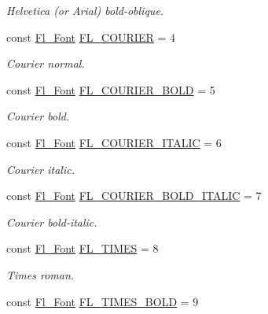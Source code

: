 \begin{DoxyCompactItemize}
\begin{DoxyCompactList}\small\item\em Helvetica (or Arial) bold-\/oblique. \end{DoxyCompactList}\item 
const \hyperlink{_enumerations_8_h_a2ac46d9f082834b969fffe490a03a709}{Fl\+\_\+\+Font} \hyperlink{_enumerations_8_h_ae722fe030bd9bcba33f045098295579d}{F\+L\+\_\+\+C\+O\+U\+R\+I\+ER} = 4
\begin{DoxyCompactList}\small\item\em Courier normal. \end{DoxyCompactList}\item 
const \hyperlink{_enumerations_8_h_a2ac46d9f082834b969fffe490a03a709}{Fl\+\_\+\+Font} \hyperlink{_enumerations_8_h_a311479135f085f16d2a7432af8f482eb}{F\+L\+\_\+\+C\+O\+U\+R\+I\+E\+R\+\_\+\+B\+O\+LD} = 5
\begin{DoxyCompactList}\small\item\em Courier bold. \end{DoxyCompactList}\item 
const \hyperlink{_enumerations_8_h_a2ac46d9f082834b969fffe490a03a709}{Fl\+\_\+\+Font} \hyperlink{_enumerations_8_h_afc9d9ab48f1f9ff634c30fd2af4bb8ad}{F\+L\+\_\+\+C\+O\+U\+R\+I\+E\+R\+\_\+\+I\+T\+A\+L\+IC} = 6
\begin{DoxyCompactList}\small\item\em Courier italic. \end{DoxyCompactList}\item 
const \hyperlink{_enumerations_8_h_a2ac46d9f082834b969fffe490a03a709}{Fl\+\_\+\+Font} \hyperlink{_enumerations_8_h_a812b67c693f4809c778d39d77d15bb90}{F\+L\+\_\+\+C\+O\+U\+R\+I\+E\+R\+\_\+\+B\+O\+L\+D\+\_\+\+I\+T\+A\+L\+IC} = 7
\begin{DoxyCompactList}\small\item\em Courier bold-\/italic. \end{DoxyCompactList}\item 
const \hyperlink{_enumerations_8_h_a2ac46d9f082834b969fffe490a03a709}{Fl\+\_\+\+Font} \hyperlink{_enumerations_8_h_a35fe64b07a0f270411dfbcbcc109033c}{F\+L\+\_\+\+T\+I\+M\+ES} = 8
\begin{DoxyCompactList}\small\item\em Times roman. \end{DoxyCompactList}\item 
const \hyperlink{_enumerations_8_h_a2ac46d9f082834b969fffe490a03a709}{Fl\+\_\+\+Font} \hyperlink{_enumerations_8_h_a41f70582714a3bd83fa3a32fb14b239f}{F\+L\+\_\+\+T\+I\+M\+E\+S\+\_\+\+B\+O\+LD} = 9

\end{DoxyCompactItemize}
